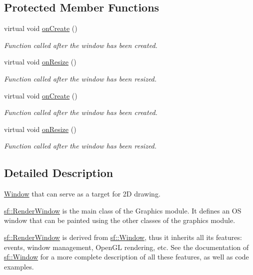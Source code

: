 \subsection*{Protected Member Functions}
\begin{DoxyCompactItemize}
\item 
virtual void \hyperlink{classsf_1_1_render_window_a5bef0040b0fa87bed9fbd459c980d53a}{on\-Create} ()
\begin{DoxyCompactList}\small\item\em Function called after the window has been created. \end{DoxyCompactList}\item 
virtual void \hyperlink{classsf_1_1_render_window_a5c85fe482313562d33ffd24a194b6fef}{on\-Resize} ()
\begin{DoxyCompactList}\small\item\em Function called after the window has been resized. \end{DoxyCompactList}\item 
virtual void \hyperlink{classsf_1_1_render_window_a5bef0040b0fa87bed9fbd459c980d53a}{on\-Create} ()
\begin{DoxyCompactList}\small\item\em Function called after the window has been created. \end{DoxyCompactList}\item 
virtual void \hyperlink{classsf_1_1_render_window_a5c85fe482313562d33ffd24a194b6fef}{on\-Resize} ()
\begin{DoxyCompactList}\small\item\em Function called after the window has been resized. \end{DoxyCompactList}\end{DoxyCompactItemize}


\subsection{Detailed Description}
\hyperlink{classsf_1_1_window}{Window} that can serve as a target for 2\-D drawing. 

\hyperlink{classsf_1_1_render_window}{sf\-::\-Render\-Window} is the main class of the Graphics module. It defines an O\-S window that can be painted using the other classes of the graphics module.

\hyperlink{classsf_1_1_render_window}{sf\-::\-Render\-Window} is derived from \hyperlink{classsf_1_1_window}{sf\-::\-Window}, thus it inherits all its features\-: events, window management, Open\-G\-L rendering, etc. See the documentation of \hyperlink{classsf_1_1_window}{sf\-::\-Window} for a more complete description of all these features, as well as code examples.

